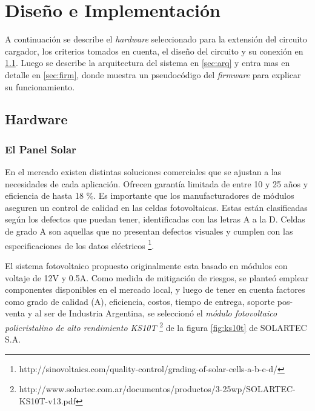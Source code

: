 
\chapter{Diseño e Implementación} %

\label{Chapter3} %

A continuación se describe el \textit{hardware} seleccionado para la extensión del circuito cargador, los criterios tomados en cuenta, el diseño del circuito y su conexión en \ref{sec:hard}. Luego se describe la arquitectura del sistema en \ref{sec:arq} y entra mas en detalle en \ref{sec:firm}, donde muestra un pseudocódigo del \textit{firmware} para explicar su funcionamiento.

\section{Hardware}
\label{sec:hard}

\subsection{El Panel Solar}
\label{subsec:panel} 
En el mercado existen distintas soluciones comerciales que se ajustan a las necesidades de cada aplicación. Ofrecen garantía limitada de entre 10 y 25 años y eficiencia de hasta 18 \%.
Es importante que los manufacturadores de módulos aseguren un control de calidad en las celdas fotovoltaicas. Estas están clasificadas según los defectos que puedan tener, identificadas con las letras A a la D. Celdas de grado A son aquellas que no presentan defectos visuales y cumplen con las especificaciones de los datos eléctricos \footnote{http://sinovoltaics.com/quality-control/grading-of-solar-cells-a-b-c-d/}.

El sistema fotovoltaico propuesto originalmente esta basado en módulos con voltaje de 12V y 0.5A. Como medida de mitigación de riesgos, se planteó emplear componentes disponibles en el mercado local, y luego de tener en cuenta factores como grado de calidad (A), eficiencia, costos, tiempo de entrega, soporte pos-venta y al ser de Industria Argentina, se seleccionó el \textit{módulo fotovoltaico policristalino de alto rendimiento KS10T} \footnote{http://www.solartec.com.ar/documentos/productos/3-25wp/SOLARTEC-KS10T-v13.pdf} de la figura \ref{fig:ks10t} de SOLARTEC S.A.

